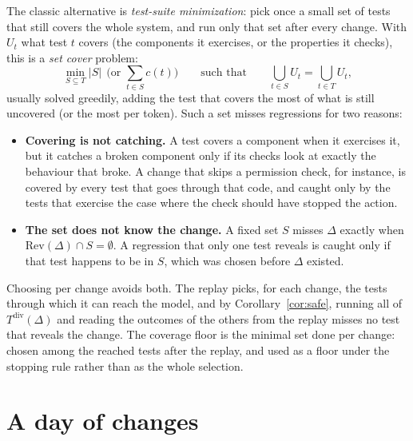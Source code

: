 \documentclass[11pt,a4paper]{article}
\newcommand{\Tdiv}{T^{\mathrm{div}}(\Delta)}
\begin{document}
The classic alternative is \emph{test-suite minimization}: pick once a small set of tests that still covers the
whole system, and run only that set after every change. With $U_t$ what test $t$ covers (the components it
exercises, or the properties it checks), this is a \emph{set cover} problem:
\[
  \min_{S \subseteq T} |S| \ \ \text{(or } \textstyle\sum_{t \in S} c(t)\text{)} \qquad \text{such that} \qquad
  \bigcup_{t \in S} U_t = \bigcup_{t \in T} U_t ,
\]
usually solved greedily, adding the test that covers the most of what is still uncovered (or the most per token).
Such a set misses regressions for two reasons:
\begin{itemize}
  \item \textbf{Covering is not catching.} A test covers a component when it exercises it, but it catches a broken
        component only if its checks look at exactly the behaviour that broke. A change that skips a permission
        check, for instance, is covered by every test that goes through that code, and caught only by the tests
        that exercise the case where the check should have stopped the action.
  \item \textbf{The set does not know the change.} A fixed set $S$ misses $\Delta$ exactly when
        $\mathrm{Rev}(\Delta) \cap S = \emptyset$. A regression that only one test reveals is caught only if that
        test happens to be in $S$, which was chosen before $\Delta$ existed.
\end{itemize}
Choosing per change avoids both. The replay picks, for each change, the tests through which it can reach the model,
and by Corollary~\ref{cor:safe}, running all of $\Tdiv$ and reading the outcomes of the others from the replay
misses no test that reveals the change. The coverage floor is the minimal set done per change: chosen among the
reached tests after the replay, and used as a floor under the stopping rule rather than as the whole selection.

\section{A day of changes}
\label{sec:day}
\end{document}
